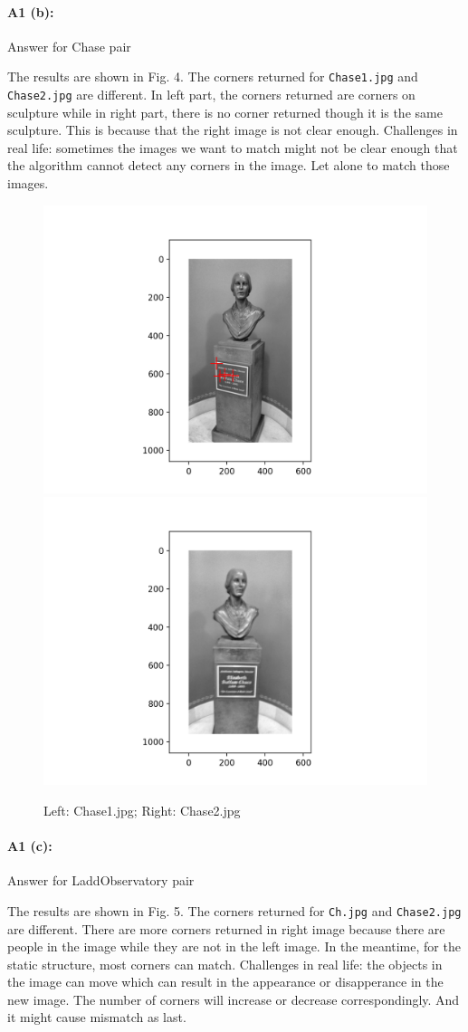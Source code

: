 \pagebreak
\paragraph{A1 (b):} Answer for Chase pair

The results are shown in Fig. 4. The corners returned for \texttt{Chase1.jpg} and \texttt{Chase2.jpg} are different. In left part, the corners returned are corners on sculpture while in right part, there is no corner returned though it is the same sculpture. This is because that the right image is not clear enough. Challenges in real life: sometimes the images we want to match might not be clear enough that the algorithm cannot detect any corners in the image. Let alone to match those images.

\begin{figure}[htbp]
    \centering
    \includegraphics[width=0.49\linewidth]{Q1_Chase1.png}
    \includegraphics[width=0.49\linewidth]{Q1_Chase2.png}
    \caption{Left: Chase1.jpg; Right: Chase2.jpg}
\end{figure}




\pagebreak
\paragraph{A1 (c):} Answer for LaddObservatory pair

The results are shown in Fig. 5. The corners returned for \texttt{Ch.jpg} and \texttt{Chase2.jpg} are different. There are more corners returned in right image because there are people in the image while they are not in the left image. In the meantime, for the static structure, most corners can match. Challenges in real life: the objects in the image can move which can result in the appearance or disapperance in the new image. The number of corners will increase or decrease correspondingly. And it might cause mismatch as last.

